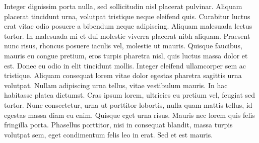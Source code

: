 Integer dignissim porta nulla, sed sollicitudin nisl placerat pulvinar. Aliquam placerat tincidunt urna, volutpat tristique neque eleifend quis. Curabitur luctus erat vitae odio posuere a bibendum neque adipiscing. Aliquam malesuada lectus tortor. In malesuada mi et dui molestie viverra placerat nibh aliquam. Praesent nunc risus, rhoncus posuere iaculis vel, molestie ut mauris. Quisque faucibus, mauris eu congue pretium, eros turpis pharetra nisl, quis luctus massa dolor et est. Donec eu odio in elit tincidunt mollis. Integer eleifend ullamcorper sem ac tristique. Aliquam consequat lorem vitae dolor egestas pharetra sagittis urna volutpat. Nullam adipiscing urna tellus, vitae vestibulum mauris. In hac habitasse platea dictumst. Cras ipsum lorem, ultricies eu pretium vel, feugiat sed tortor. Nunc consectetur, urna ut porttitor lobortis, nulla quam mattis tellus, id egestas massa diam eu enim. Quisque eget urna risus. Mauris nec lorem quis felis fringilla porta. Phasellus porttitor, nisi in consequat blandit, massa turpis volutpat sem, eget condimentum felis leo in erat. Sed et est mauris. 